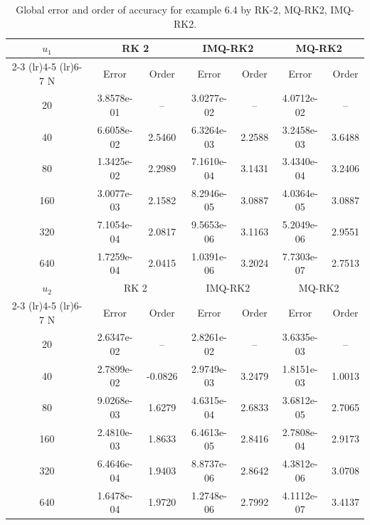 \documentclass[a4paper, preprint,11pt]{elsarticle}
\numberwithin{equation}{section}
\begin{document}
\begin{table}[h]
    \centering
    \caption{Global error and order of accuracy for example 6.4 by RK-2, MQ-RK2, IMQ-RK2.}
    \begin{tabular}{c c c c c c c }
        \toprule
        $u_1$ & \multicolumn{2}{c}{RK 2} & \multicolumn{2}{c}{IMQ-RK2} & \multicolumn{2}{c}{MQ-RK2 } \\
        \cmidrule(lr){2-3} \cmidrule(lr){4-5} \cmidrule(lr){6-7} 
         N & Error & Order & Error & Order & Error & Order \\
        \midrule
        20 &  3.8578e-01   & --& 3.0277e-02   &-- & 4.0712e-02 &--  \\
        40 &  6.6058e-02      &   2.5460 &6.3264e-03   &2.2588 & 3.2458e-03   & 3.6488  \\
        80  &  1.3425e-02 &  2.2989 & 7.1610e-04   & 3.1431&3.4340e-04 & 3.2406 \\
        160  & 3.0077e-03 &  2.1582 & 8.2946e-05  &3.0887  &4.0364e-05 & 3.0887	 \\
        320 &   7.1054e-04 &  2.0817&  9.5653e-06 & 3.1163 &5.2049e-06  &  2.9551 \\
        640 &  1.7259e-04  &   2.0415 & 1.0391e-06  & 3.2024 &7.7303e-07 &2.7513 \\
       \midrule
        $u_2$ & \multicolumn{2}{c}{RK 2} & \multicolumn{2}{c}{IMQ-RK2} & \multicolumn{2}{c}{MQ-RK2} \\
        \cmidrule(lr){2-3} \cmidrule(lr){4-5} \cmidrule(lr){6-7} 
         N & Error & Order & Error & Order & Error & Order  \\
        \midrule  
 20 & 2.6347e-02 & --& 2.8261e-02 &-- & 3.6335e-03   &--  \\
        40 & 2.7899e-02 & -0.0826	 &  2.9749e-03   & 3.2479&1.8151e-03  & 1.0013\\
        80  &  9.0268e-03 & 1.6279 &4.6315e-04   &2.6833 &3.6812e-05  &2.7065  \\
        160  & 2.4810e-03 &1.8633&6.4613e-05  &  2.8416 & 2.7808e-04    &2.9173 \\
        320 & 6.4646e-04 &1.9403 &8.8737e-06  &  2.8642 &4.3812e-06   &3.0708  \\
        640 &   1.6478e-04  & 1.9720 &1.2748e-06     &2.7992  & 4.1112e-07& 3.4137 \\
\bottomrule
    \end{tabular}
\end{table}
\end{document}
